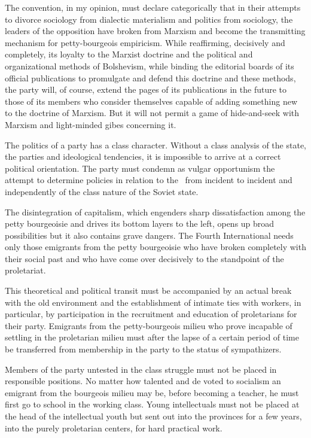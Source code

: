 The convention, in my opinion, must declare categorically that in their attempts to divorce sociology from dialectic materialism and politics from sociology, the leaders of the opposition have broken from Marxism and become the transmitting mechanism for petty-bourgeois empiricism. While reaffirming, decisively and completely, its loyalty to the Marxist doctrine and the political and organizational methods of Bolshevism, while binding the editorial boards of its official publications to promulgate and defend this doctrine and these methods, the party will, of course, extend the pages of its publications in the future to those of its members who consider themselves capable of adding something new to the doctrine of Marxism. But it will not permit a game of hide-and-seek with Marxism and light-minded gibes concerning it.

The politics of a party has a class character. Without a class analysis of the state, the parties and ideological tendencies, it is impossible to arrive at a correct political orientation. The party must condemn as vulgar opportunism the attempt to determine policies in relation to the \USSR\ from incident to incident and independently of the class nature of the Soviet state.

The disintegration of capitalism, which engenders sharp dissatisfaction among the petty bourgeoisie and drives its bottom layers to the left, opens up broad possibilities but it also contains grave dangers. The Fourth International needs only those emigrants from the petty bourgeoisie who have broken completely with their social past and who have come over decisively to the standpoint of the proletariat.

This theoretical and political transit must be accompanied by an actual break with the old environment and the establishment of intimate ties with workers, in particular, by participation in the recruitment and education of proletarians for their party. Emigrants from the petty-bourgeois milieu who prove incapable of settling in the proletarian milieu must after the lapse of a certain period of time be transferred from membership in the party to the status of sympathizers.

Members of the party untested in the class struggle must not be placed in responsible positions. No matter how talented and de voted to socialism an emigrant from the bourgeois milieu may be, before becoming a teacher, he must first go to school in the working class. Young intellectuals must not be placed at the head of the intellectual youth but sent out into the provinces for a few years, into the purely proletarian centers, for hard practical work.

